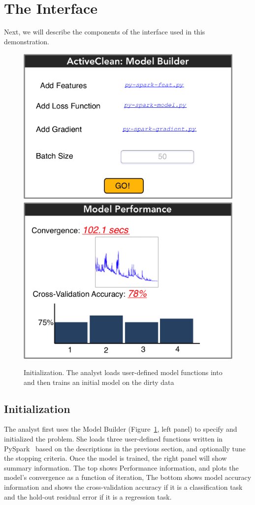 \section{The Interface}
Next, we will describe the components of the \sys interface used in this demonstration. 

\begin{figure}[t]
\centering
 \includegraphics[width=0.49\columnwidth]{figs/interface1.png}
 \includegraphics[width=0.46\columnwidth]{figs/interface2.png}
 \caption{Initialization. The analyst loads user-defined model functions into \sys and then trains an initial model on the dirty data \label{irun}}
\end{figure}

\subsection{Initialization}
The analyst first uses the \textsf{Model Builder} (Figure~\ref{irun}, left panel) to specify and initialized the problem.
She loads three user-defined functions written in PySpark~\cite{pyspark} based on the descriptions in the previous section, and
optionally  tune the stopping criteria.
Once the model is trained, the right panel will show summary information.
The top shows \textsf{Performance} information, and plots the model's convergence as a function of iteration,
The bottom shows model accuracy information and shows the cross-validation accuracy if it is a classification task and the hold-out residual error if it is a regression task.

